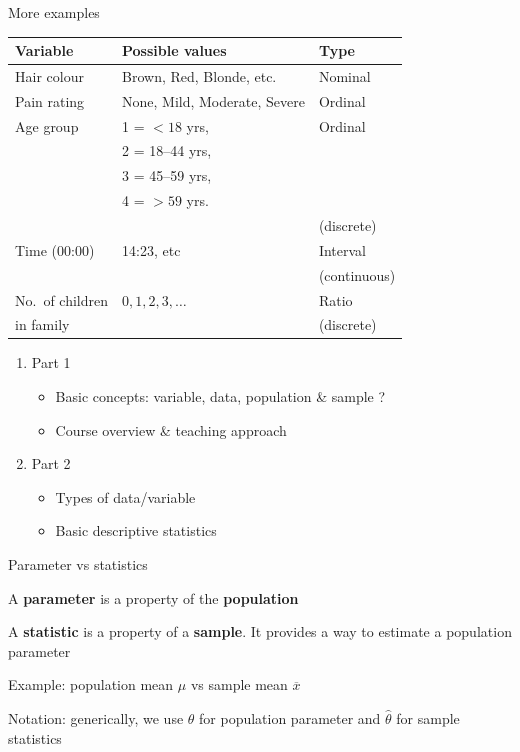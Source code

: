 \documentclass{beamer}
\begin{document}
\begin{frame}{More examples}
\begin{tabular}{lll} \hline
{\bf Variable} & {\bf Possible values} & {\bf Type} \\ \hline
Hair colour & {Brown, Red, Blonde, etc.} & {Nominal} \\ \hline
Pain rating & {None, Mild, Moderate, Severe} & {Ordinal} \\ \hline
Age group & {1 = $< 18$ yrs,} & {Ordinal} \\
& {2 = 18--44 yrs,} & \\
& {3 = 45--59 yrs,} & \\
& {4 = $> 59$ yrs.} & \\ 
& &  {(discrete)} \\ \hline
Time (00:00) & {14:23}, etc & {Interval}  \\
& &  {(continuous)} \\ \hline
No.\ of children & {$0,1,2,3,\ldots$} & {Ratio} \\
in family & & {(discrete)}  \\ \hline
\end{tabular}
\end{frame}
\begin{frame}
\begin{enumerate}
\item Part 1 
\begin{itemize}
\item Basic concepts: variable, data, population \& sample
?
\item Course overview \& teaching approach
\end{itemize}
\item Part 2 
\begin{itemize}
\item Types of data/variable
\item Basic descriptive statistics
\end{itemize}


\end{enumerate}
\end{frame}

\begin{frame}{Parameter vs statistics}

A {\bf parameter} is a property of the {\bf population}

A {\bf statistic} is a property of a {\bf sample}. 
It provides a way to estimate a
population parameter

Example:  population mean $\mu$ vs sample mean $\overline x$

Notation: generically, we use $\theta$ for population parameter and $\hat \theta$ for sample statistics


\end{frame}
\end{document}
